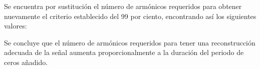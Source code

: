 \documentclass[11pt,a4paper,twocolumn]{article}
\begin{document}
    Se encuentra por sustitución el número de armónicos requeridos para obtener 
    nuevamente el criterio establecido del 99 por ciento, encontrando así los siguientes 
    valores:


    Se concluye que el número de armónicos requeridos para tener una reconstrucción 
    adecuada de la señal aumenta proporcionalmente a la duración del periodo de ceros 
    añadido.
\end{document}
